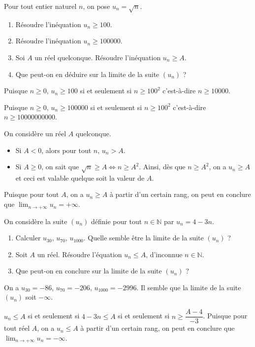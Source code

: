 \documentclass[11pt,fleqn]{book} %
\begin{document}
\begin{exercise} Pour tout entier naturel $n$, on pose $u_n=\sqrt{n}$.
\begin{enumerate}
\item Résoudre l'inéquation $u_n \geqslant 100$.
\item Résoudre l'inéquation $u_n \geqslant 100000$.
\item Soi $A$ un réel quelconque. Résoudre l'inéquation $u_n \geqslant A$.
\item Que peut-on en déduire sur la limite de la suite $(u_n)$ ?
\end{enumerate}
\end{exercise}
\begin{solution}Puisque $n \geqslant 0$, $u_n \geqslant 100$ si et seulement si $n \geqslant 100^2$ c'est-à-dire $n \geqslant 10000$.

Puisque $n \geqslant 0$, $u_n \geqslant 100000$ si et seulement si $n \geqslant 100^2$ c'est-à-dire $n \geqslant 10000000000$.

On considère un réel $A$ quelconque.
\begin{itemize}
\item Si $A<0$, alors pour tout $n$, $u_n>A$.
\item Si $A\geqslant 0$, on sait que $\sqrt{n} \geqslant A \Leftrightarrow n \geqslant A^2$. Ainsi, dès que $n\geqslant A^2$, on a $u_n \geqslant A$ et ceci est valable quelque soit la valeur de $A$.
\end{itemize}

Puisque pour tout $A$, on a $u_n \geqslant A$ à partir d'un certain rang, on peut en conclure que $\displaystyle \lim _{n\to +\infty} u_n = +\infty$.\end{solution}



\begin{exercise}On considère la suite $(u_n)$ définie pour tout $n\in \mathbb{N}$ par  $u_n=4-3n$.
\begin{enumerate}
\item Calculer $u_{30}$, $u_{70}$, $u_{1000}$. Quelle semble être la limite de la suite $(u_n)$ ?
\item Soit $A$ un réel. Résoudre l'équation $u_n \leqslant A$, d'inconnue $n\in\mathbb{N}$.
\item Que peut-on en conclure sur la limite de la suite $(u_n)$ ?
\end{enumerate}
\end{exercise}
\begin{solution}On a $u_{30}=-86$, $u_{70}=-206$, $u_{1000}=-2996$. Il semble que la limite de la suite $(u_n)$ soit $-\infty$.

$u_n\leqslant A$ si et seulement si $4-3n \leqslant A$ si et seulement si $n\geqslant \dfrac{A-4}{-3}$. Puisque pour tout réel $A$, on a $u_n \leqslant A$ à partir d'un certain rang, on peut en conclure que $\displaystyle \lim _{n\to +\infty} u_n = -\infty$.\end{solution}
\end{document}
